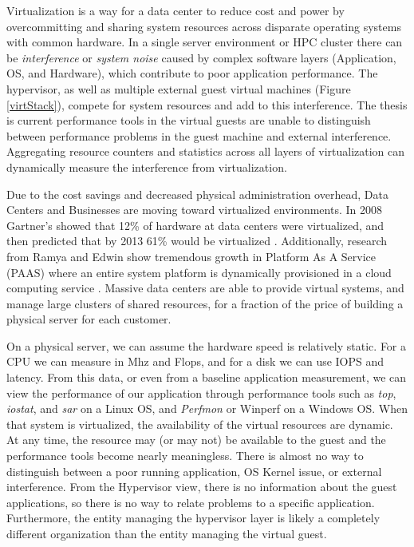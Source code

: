 Virtualization is a way for a data center to reduce cost and power by overcommitting and sharing system resources across disparate operating systems with common hardware.  
In a single server environment or HPC cluster there can be \emph{interference} \cite{paul} or \emph{system noise}\cite{tsafrir} caused by complex software layers (Application, OS, and Hardware), which contribute to poor application performance.  
The hypervisor, as well as multiple external guest virtual machines (Figure \ref{virtStack}), compete for system resources and add to this interference.  
The thesis is current performance tools in the virtual guests are unable to distinguish between performance problems in the guest machine and external interference.  Aggregating resource counters and statistics across all layers of virtualization can dynamically measure the interference from virtualization.

\indent Due to the cost savings and decreased physical administration overhead, Data Centers and Businesses are moving toward virtualized environments.  In 2008 Gartner’s showed that 12\% of hardware at data centers were virtualized, and then predicted that by 2013 61\% would be virtualized \cite{gartners}.   Additionally, research from Ramya and Edwin show tremendous growth in Platform As A Service (PAAS) where an entire system platform is dynamically provisioned in a cloud computing service \cite{ramya}.   Massive data centers are able to provide virtual systems, and manage large clusters of shared resources, for a fraction of the price of building a physical server for each customer.

On a physical server, we can assume the hardware speed is relatively static.  For a CPU we can measure in Mhz and Flops, and for a disk we can use IOPS and latency.  From this data, or even from a baseline application measurement, we can view the performance of our application through performance tools such as \emph{top}, \emph{iostat}, and \emph{sar} on a Linux OS, and \emph{Perfmon} or {Winperf} on a Windows OS.  When that system is virtualized, the availability of the virtual resources are dynamic.  At any time, the resource may (or may not) be available to the guest and the performance tools become nearly meaningless.  There is almost no way to distinguish between a poor running application, OS Kernel issue, or external interference.  From the Hypervisor view, there is no information about the guest applications, so there is no way to relate problems to a specific application.  Furthermore, the entity managing the hypervisor layer is likely a completely different organization than the entity managing the virtual guest. 

